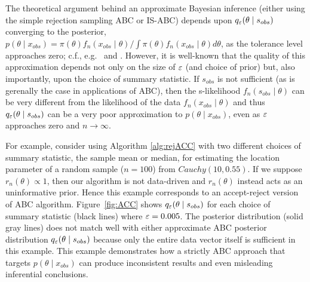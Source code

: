 \vspace{-6mm} 

\noindent
\hrulefill

The theoretical argument behind an approximate Bayesian inference (either using the simple rejection sampling ABC or IS-ABC) %
 depends upon $q_{\varepsilon}(\theta\mid s_{\relax obs})$ converging to the posterior, $p(\theta \mid x_{obs}) = {\pi(\theta) f_n ( x_{obs} \mid\theta)}\big/{\int \pi(\theta) f_n ( x_{obs} \mid\theta)
d \theta }$, as the tolerance level approaches zero; c.f., e.g.~\cite{Marin2011} and \cite{Beaumont2019}. However, it is well-known that the quality of this approximation depends not only on the size of $\varepsilon$ (and choice of prior) but, also importantly, upon the choice of summary statistic. If $s_{obs}$ is not sufficient (as is gerenally the case in applications of ABC), then the s-likelihood $f_n (s_{obs} \mid\theta)$ can be very different from the likelihood of the data $f_n ( x_{obs} \mid\theta)$ and thus $q_{\varepsilon}(\theta\mid s_{\relax obs})$ can be a very poor approximation to $p(\theta\mid x_{obs})$, even as $\varepsilon$ approaches zero and $n \rightarrow \infty$.

For example, consider using Algorithm \ref{alg:rejACC} with two different choices of summary statistic, the sample mean or median, for estimating the location parameter of a random sample ($n=100$) from $Cauchy(10, 0.55)$. If we suppose $r_n(\theta) \propto 1$, then our algorithm is not data-driven and $r_n(\theta)$ instead acts as an uninformative prior. Hence this example corresponds to an accept-reject version of ABC algorithm. 
Figure~\ref{fig:ACC} shows $q_{\varepsilon}(\theta\mid s_{\relax obs})$ for each choice of summary statistic (black lines) where $\varepsilon = 0.005$. 
The posterior distribution (solid gray lines) does not match well with either approximate ABC posterior distribution $q_{\varepsilon}(\theta\mid s_{\relax obs})$ because only the entire data vector itself is sufficient in this example. This example demonstrates how a strictly ABC approach that targets $p(\theta \mid x_{obs})$ can produce inconsistent results and even misleading inferential conclusions.

